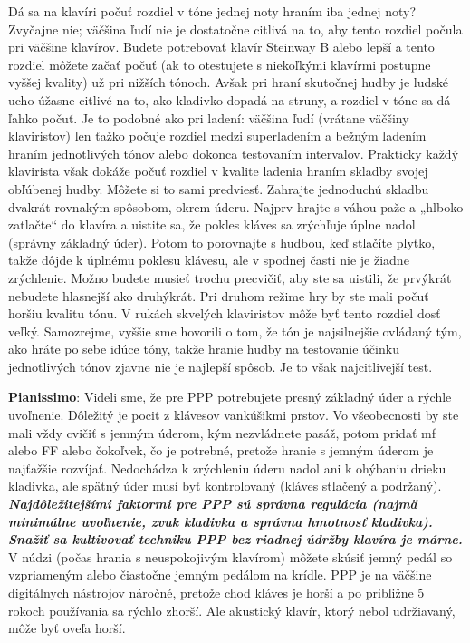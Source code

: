 \documentclass[11pt,a4paper%
]{book}
\begin{document}
Dá sa na klavíri počuť rozdiel v tóne jednej noty hraním iba jednej noty? Zvyčajne nie; väčšina ľudí nie je dostatočne citlivá na to, aby tento rozdiel počula pri väčšine klavírov. Budete potrebovať klavír Steinway B alebo lepší a tento rozdiel môžete začať počuť (ak to otestujete s niekoľkými klavírmi postupne vyššej kvality) už pri nižších tónoch. Avšak pri hraní skutočnej hudby je ľudské ucho úžasne citlivé na to, ako kladivko dopadá na struny, a rozdiel v tóne sa dá ľahko počuť. Je to podobné ako pri ladení: väčšina ľudí (vrátane väčšiny klaviristov) len ťažko počuje rozdiel medzi superladením a bežným ladením hraním jednotlivých tónov alebo dokonca testovaním intervalov. Prakticky každý klavirista však dokáže počuť rozdiel v kvalite ladenia hraním skladby svojej obľúbenej hudby. Môžete si to sami predviesť. Zahrajte jednoduchú skladbu dvakrát rovnakým spôsobom, okrem úderu. Najprv hrajte s váhou paže a „hlboko zatlačte`` do klavíra a uistite sa, že pokles kláves sa zrýchľuje úplne nadol (správny základný úder). Potom to porovnajte s hudbou, keď stlačíte plytko, takže dôjde k úplnému poklesu klávesu, ale v spodnej časti nie je žiadne zrýchlenie. Možno budete musieť trochu precvičiť, aby ste sa uistili, že prvýkrát nebudete hlasnejší ako druhýkrát. Pri druhom režime hry by ste mali počuť horšiu kvalitu tónu. V rukách skvelých klaviristov môže byť tento rozdiel dosť veľký. Samozrejme, vyššie sme hovorili o tom, že tón je najsilnejšie ovládaný tým, ako hráte po sebe idúce tóny, takže hranie hudby na testovanie účinku jednotlivých tónov zjavne nie je najlepší spôsob. Je to však najcitlivejší test.

\textbf{Pianissimo}: Videli sme, že pre PPP potrebujete presný základný úder a rýchle uvoľnenie. Dôležitý je pocit z klávesov vankúšikmi prstov. Vo všeobecnosti by ste mali vždy cvičiť s jemným úderom, kým nezvládnete pasáž, potom pridať mf alebo FF alebo čokoľvek, čo je potrebné, pretože hranie s jemným úderom je najťažšie rozvíjať. Nedochádza k zrýchleniu úderu nadol ani k ohýbaniu drieku kladivka, ale spätný úder musí byť kontrolovaný (kláves stlačený a podržaný). \emph{\textbf{Najdôležitejšími faktormi pre PPP sú správna regulácia (najmä minimálne uvoľnenie, zvuk kladivka a správna hmotnosť kladivka). Snažiť sa kultivovať techniku PPP bez riadnej údržby klavíra je márne.}} V núdzi (počas hrania s neuspokojivým klavírom) môžete skúsiť jemný pedál so vzpriameným alebo čiastočne jemným pedálom na krídle. PPP je na väčšine digitálnych nástrojov náročné, pretože chod kláves je horší a po približne 5 rokoch používania sa rýchlo zhorší. Ale akustický klavír, ktorý nebol udržiavaný, môže byť oveľa horší.
\end{document}
